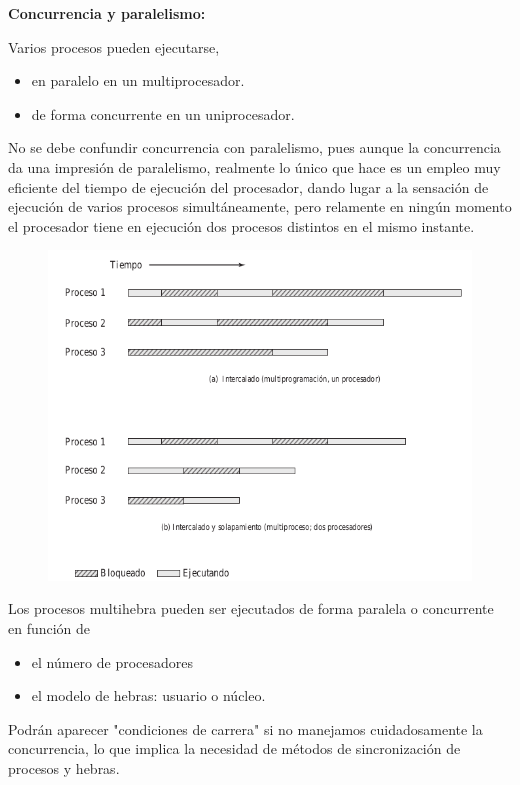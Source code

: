 \documentclass{article}
\begin{document}
\textbf{Concurrencia y paralelismo:}

Varios procesos pueden ejecutarse,
\begin{itemize}
\item en paralelo en un multiprocesador.

\item de forma concurrente en un uniprocesador.
\end{itemize}

No se debe confundir concurrencia con paralelismo, pues aunque la concurrencia da una impresión de paralelismo, realmente lo único que hace es un empleo muy eficiente del tiempo de ejecución del procesador, dando lugar a la sensación de ejecución de varios procesos simultáneamente, pero relamente en ningún momento el procesador tiene en ejecución dos procesos distintos en el mismo instante.

\begin{figure}[h]
\centering
\includegraphics[scale=1, width=\textwidth]{concurrenciavsparalelismo.png}
\end{figure}

Los procesos multihebra pueden ser ejecutados de forma paralela o concurrente en función de
\begin{itemize}
\item el número de procesadores

\item el modelo de hebras: usuario o núcleo.
\end{itemize}

Podrán aparecer "condiciones de carrera" si no manejamos cuidadosamente la concurrencia, lo que implica la necesidad de métodos de sincronización de procesos y hebras.
\end{document}
